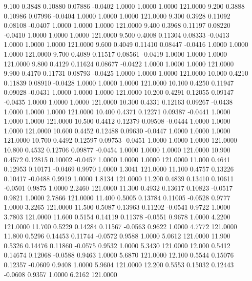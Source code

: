    9.100   0.3848   0.10880   0.07886  -0.0402   1.0000   1.0000   1.0000 121.0000
   9.200   0.3888   0.10986   0.07996  -0.0404   1.0000   1.0000   1.0000 121.0000
   9.300   0.3928   0.11092   0.08108  -0.0407   1.0000   1.0000   1.0000 121.0000
   9.400   0.3968   0.11197   0.08220  -0.0410   1.0000   1.0000   1.0000 121.0000
   9.500   0.4008   0.11304   0.08333  -0.0413   1.0000   1.0000   1.0000 121.0000
   9.600   0.4049   0.11410   0.08447  -0.0416   1.0000   1.0000   1.0000 121.0000
   9.700   0.4089   0.11517   0.08561  -0.0419   1.0000   1.0000   1.0000 121.0000
   9.800   0.4129   0.11624   0.08677  -0.0422   1.0000   1.0000   1.0000 121.0000
   9.900   0.4170   0.11731   0.08793  -0.0425   1.0000   1.0000   1.0000 121.0000
  10.000   0.4210   0.11839   0.08910  -0.0428   1.0000   1.0000   1.0000 121.0000
  10.100   0.4250   0.11947   0.09028  -0.0431   1.0000   1.0000   1.0000 121.0000
  10.200   0.4291   0.12055   0.09147  -0.0435   1.0000   1.0000   1.0000 121.0000
  10.300   0.4331   0.12163   0.09267  -0.0438   1.0000   1.0000   1.0000 121.0000
  10.400   0.4371   0.12271   0.09387  -0.0441   1.0000   1.0000   1.0000 121.0000
  10.500   0.4412   0.12379   0.09508  -0.0444   1.0000   1.0000   1.0000 121.0000
  10.600   0.4452   0.12488   0.09630  -0.0447   1.0000   1.0000   1.0000 121.0000
  10.700   0.4492   0.12597   0.09753  -0.0451   1.0000   1.0000   1.0000 121.0000
  10.800   0.4532   0.12706   0.09877  -0.0454   1.0000   1.0000   1.0000 121.0000
  10.900   0.4572   0.12815   0.10002  -0.0457   1.0000   1.0000   1.0000 121.0000
  11.000   0.4641   0.12953   0.10171  -0.0469   0.9970   1.0000   1.3041 121.0000
  11.100   0.4757   0.13226   0.10417  -0.0488   0.9919   1.0000   1.8134 121.0000
  11.200   0.4839   0.13410   0.10611  -0.0501   0.9875   1.0000   2.2460 121.0000
  11.300   0.4932   0.13617   0.10823  -0.0517   0.9821   1.0000   2.7866 121.0000
  11.400   0.5005   0.13784   0.11005  -0.0528   0.9777   1.0000   3.2265 121.0000
  11.500   0.5087   0.13963   0.11202  -0.0541   0.9722   1.0000   3.7803 121.0000
  11.600   0.5154   0.14119   0.11378  -0.0551   0.9678   1.0000   4.2200 121.0000
  11.700   0.5229   0.14284   0.11567  -0.0563   0.9622   1.0000   4.7772 121.0000
  11.800   0.5296   0.14453   0.11744  -0.0572   0.9588   1.0000   5.0612 121.0000
  11.900   0.5326   0.14476   0.11860  -0.0575   0.9532   1.0000   5.3430 121.0000
  12.000   0.5412   0.14674   0.12068  -0.0588   0.9463   1.0000   5.6870 121.0000
  12.100   0.5544   0.15076   0.12357  -0.0609   0.9408   1.0000   5.9604 121.0000
  12.200   0.5553   0.15032   0.12443  -0.0608   0.9357   1.0000   6.2162 121.0000
